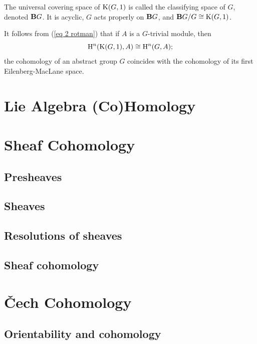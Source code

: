 \begin{defn}
    The universal covering space of $\rmK(G,1)$ is called the classifying space of $G$, denoted $\bf{B}G$. It is acyclic, $G$ acts properly on $\bf{B}G$, and $\bf{B}G\slash G\cong \rmK(G,1)$.
\end{defn}

It follows from (\ref{eq 2 rotman}) that if $A$ is a $G$-trivial module, then
\[\rmH^n(\rmK(G,1),A)\cong \rmH^n(G,A);\]
the cohomology of an abstract group $G$ coincides with the cohomology of its first Eilenberg-MacLane space.



\section{Lie Algebra (Co)Homology \texorpdfstring{\ucmark}{}}






\section{Sheaf Cohomology \texorpdfstring{\ucmark}{}}
\subsection{Presheaves}

\subsection{Sheaves}

\subsection{Resolutions of sheaves}

\subsection{Sheaf cohomology}




\section{\v Cech Cohomology \texorpdfstring{\ucmark}{}}

\subsection{Orientability and cohomology}

